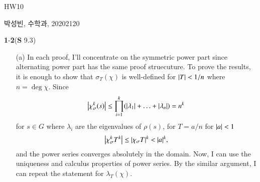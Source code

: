 \documentclass[a4paper, 12pt]{article}
\theoremstyle{Mydefinition}
\theoremstyle{Mytheorem}
\begin{document}
\thispagestyle{myfirstpage}
\begin{center}
	\Large{HW10}
\end{center}
박성빈, 수학과, 20202120

\noindent \textbf{1}-\textbf{2}(\textbf{S} 9.3)
\begin{enumerate}
    \item[(a)] In each proof, I'll concentrate on the symmetric power part since alternating power part has the same proof struecuture. To prove the results, it is enough to show that $\sigma_T(\chi)$ is well-defined for $\abs{T}<1/n$ where $n=\deg \chi$. Since 
    \begin{equation}
        \abs{\chi^k_\sigma(s)}\leq \prod_{i=1}^k (\abs{\lambda_1}+\ldots +\abs{\lambda_n}) = n^k
    \end{equation}
    for $s\in G$ where $\lambda_i$ are the eigenvalues of $\rho(s)$, for $T=a/n$ for $\abs{a}<1$
\begin{equation}
    \abs{\chi_\sigma^k T^k}\leq \abs{\chi_\sigma T}^k< \abs{a}^k,
\end{equation}
and the power series converges absolutely in the domain. Now, I can use the uniqueness and calculus properties of power series. By the similar argument, I can repeat the statement for $\lambda_T(\chi)$.


\end{enumerate}
\end{document}
